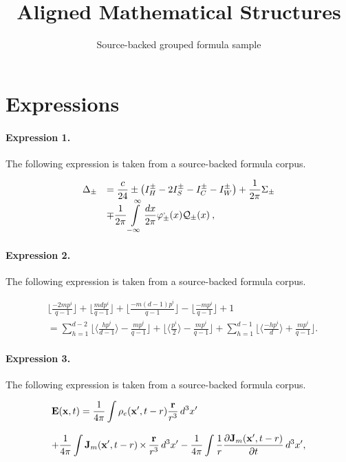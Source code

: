 \documentclass[11pt]{article}
\title{Aligned Mathematical Structures}
\author{Source-backed grouped formula sample}
\date{}
\begin{document}
\maketitle
\section{Expressions}
\paragraph{Expression 1.} The following expression is taken from a source-backed formula corpus.

\begin{align*}\begin{array}{rl}\displaystyle \Delta _{\pm } & =\displaystyle\frac{c}{24}\pm \left( I^{\pm }_{H}-2I^{\pm }_{S}-I^{\pm }_{C}-I^{\pm }_{W}\right) +\displaystyle\frac{1}{2\pi }\Sigma _{\pm }\\ & \mp \displaystyle\frac{1}{2\pi }\displaystyle\int\limits ^{\infty }_{-\infty }\displaystyle\frac{dx}{2\pi }\varphi ^{,}_{\pm }(x){\cal Q}_{\pm }(x)\: ,\end{array}\end{align*}

\paragraph{Expression 2.} The following expression is taken from a source-backed formula corpus.

\begin{align*}&\lfloor\frac{-2mp^i}{q-1}\rfloor+\lfloor\frac{mdp^i}{q-1}\rfloor+\lfloor\frac{-m(d-1)p^i}{q-1}\rfloor-\lfloor\frac{-mp^i}{q-1}\rfloor+1\\&=\sum_{h=1}^{d-2}\lfloor\langle\frac{hp^i}{d-1}\rangle-\frac{mp^i}{q-1}\rfloor+\lfloor\langle\frac{p^i}{2}\rangle-\frac{mp^i}{q-1}\rfloor+\sum_{h=1}^{d-1}\lfloor\langle \frac{-hp^i}{d}\rangle+\frac{mp^i}{q-1}\rfloor.\end{align*}

\paragraph{Expression 3.} The following expression is taken from a source-backed formula corpus.

\begin{align*}\begin{array}{l}\mathbf{E}(\mathbf{x},t) =\displaystyle\frac{1}{4\pi}\int\rho_e(\mathbf{x}',t-r)\frac{\mathbf{r}}{r^3}\,d^3x'\\~\\+\displaystyle\frac{1}{4\pi}\int\mathbf{J}_m(\mathbf{x}',t-r)\,{\bf\times}\,\frac{\mathbf{r}}{r^3}\,d^3x'-\displaystyle\frac{1}{4\pi}\int\frac{1}{r}\frac{\partial\mathbf{J}_m(\mathbf{x}',t-r)}{\partial t}\,d^3x' ,\end{array}\end{align*}
\end{document}
